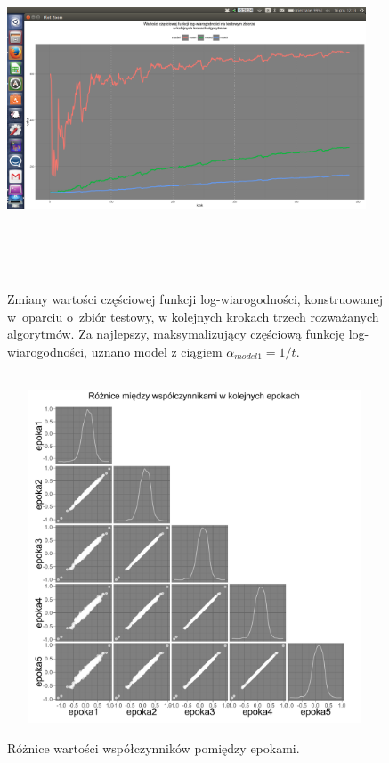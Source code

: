 \begin{figure}[!ht]
\centering
\includegraphics[width=0.95\textwidth, height = 280pt]{Obrazki/analiza/wartosci_loglik_test_ver_minus.png}
\caption{\label{wykres5} Zmiany wartości częściowej funkcji log-wiarogodności, konstruowanej w~oparciu o~zbiór testowy, w kolejnych krokach trzech rozważanych algorytmów. Za najlepszy, maksymalizujący częściową funkcję log-wiarogodności, uznano model z ciągiem $\alpha_{model1} = 1/t$.}
\ \\
\includegraphics[width=0.99\textwidth, height = 280pt]{Obrazki/analiza/ggpairs_2.pdf}
\caption{\label{wykres6} Różnice wartości współczynników pomiędzy epokami.}
\end{figure}

